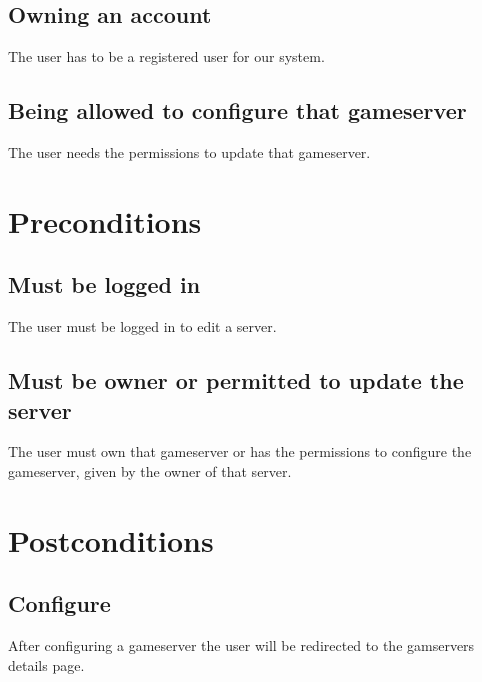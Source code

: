 \documentclass[a4paper,12pt,chapterprefix=false,bibliography=totoc,listof=totoc,]{scrreprt}
\begin{document}
\section{Owning an account}
The user has to be a registered user for our system.

\section{Being allowed to configure that gameserver}
The user needs the permissions to update that gameserver.

\chapter{Preconditions}
\section{Must be logged in}
The user must be logged in to edit a server.

\section{Must be owner or permitted to update the server}
The user must own that gameserver or has the permissions to configure the gameserver, given by the owner of that server.

\chapter{Postconditions}

\section{Configure}
After configuring a gameserver the user will be redirected to the gamservers details page.
\end{document}
